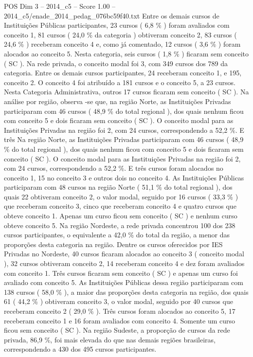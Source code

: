 \begin{textsample}{POS Dim 3 – 2014\_c5 – Score 1.00 – 2014\_c5/enade\_2014\_pedag\_076bc59f40.txt}
Entre os demais cursos de Instituições Públicas participantes, 23 cursos ( 6,8 \% ) foram avaliados com conceito 1, 81 cursos ( 24,0 \% da categoria ) obtiveram conceito 2, 83 cursos ( 24,6 \% ) receberam conceito 4 e, como já comentado, 12 cursos ( 3,6 \% ) foram alocados ao conceito 5.
Nesta categoria, seis cursos ( 1,8 \% ) ficaram sem conceito ( SC ).
Na rede privada, o conceito modal foi 3, com 349 cursos dos 789 da categoria.
Entre os demais cursos participantes, 24 receberam conceito 1, e 195, conceito 2.
O conceito 4 foi atribuído a 181 cursos e o conceito 5, a 23 cursos.
Nesta Categoria Administrativa, outros 17 cursos ficaram sem conceito ( SC ).
Na análise por região, observa -se que, na região Norte, as Instituições Privadas participaram com 46 cursos ( 48,9 \% do total regional ), dos quais nenhum ficou com conceito 5 e dois ficaram sem conceito ( SC ).
O conceito modal para as Instituições Privadas na região foi 2, com 24 cursos, correspondendo a 52,2 \%.
E três Na região Norte, as Instituições Privadas participaram com 46 cursos ( 48,9 \% do total regional ), dos quais nenhum ficou com conceito 5 e dois ficaram sem conceito ( SC ).
O conceito modal para as Instituições Privadas na região foi 2, com 24 cursos, correspondendo a 52,2 \%.
E três cursos foram alocados no conceito 1, 15 no conceito 3 e outros dois no conceito 4.
As Instituições Públicas participaram com 48 cursos na região Norte ( 51,1 \% do total regional ), dos quais 22 obtiveram conceito 2, o valor modal, seguido por 16 cursos ( 33,3 \% ) que receberam conceito 3, cinco que receberam conceito 4 e quatro cursos que obteve conceito 1.
Apenas um curso ficou sem conceito ( SC ) e nenhum curso obteve conceito 5.
Na região Nordeste, a rede privada concentrou 100 dos 238 cursos participantes, o equivalente a 42,0 \% do total da região, a menor das proporções desta categoria na região.
Dentre os cursos oferecidos por IES Privadas no Nordeste, 40 cursos ficaram alocados ao conceito 3 ( conceito modal ), 32 cursos obtiveram conceito 2, 14 receberam conceito 4 e dez foram avaliados com conceito 1.
Três cursos ficaram sem conceito ( SC ) e apenas um curso foi avaliado com conceito 5.
As Instituições Públicas dessa região participaram com 138 cursos ( 58,0 \% ), a maior das proporções desta categoria na região, dos quais 61 ( 44,2 \% ) obtiveram conceito 3, o valor modal, seguido por 40 cursos que receberam conceito 2 ( 29,0 \% ).
Três cursos foram alocados ao conceito 5, 17 receberam conceito 1 e 16 foram avaliados com conceito 4.
Somente um curso ficou sem conceito ( SC ).
Na região Sudeste, a proporção de cursos da rede privada, 86,9 \%, foi mais elevada do que nas demais regiões brasileiras, correspondendo a 430 dos 495 cursos participantes.

\end{textsample}
